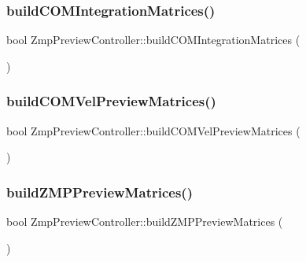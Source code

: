 \subsubsection{\texorpdfstring{build\+C\+O\+M\+Integration\+Matrices()}{buildCOMIntegrationMatrices()}}
{\footnotesize\ttfamily bool Zmp\+Preview\+Controller\+::build\+C\+O\+M\+Integration\+Matrices (\begin{DoxyParamCaption}{ }\end{DoxyParamCaption})}

\hypertarget{classZmpPreviewController_aa763d1c7a769f21eeaaaeb3f09a32aef}{}\label{classZmpPreviewController_aa763d1c7a769f21eeaaaeb3f09a32aef} 
\subsubsection{\texorpdfstring{build\+C\+O\+M\+Vel\+Preview\+Matrices()}{buildCOMVelPreviewMatrices()}}
{\footnotesize\ttfamily bool Zmp\+Preview\+Controller\+::build\+C\+O\+M\+Vel\+Preview\+Matrices (\begin{DoxyParamCaption}{ }\end{DoxyParamCaption})}

\hypertarget{classZmpPreviewController_aadf1b7cba1ac0a1e6ec3bc8e0b761d02}{}\label{classZmpPreviewController_aadf1b7cba1ac0a1e6ec3bc8e0b761d02} 
\subsubsection{\texorpdfstring{build\+Z\+M\+P\+Preview\+Matrices()}{buildZMPPreviewMatrices()}}
{\footnotesize\ttfamily bool Zmp\+Preview\+Controller\+::build\+Z\+M\+P\+Preview\+Matrices (\begin{DoxyParamCaption}{ }\end{DoxyParamCaption})}

\hypertarget{classZmpPreviewController_a321140d8b3d99cf82687c444344c161d}{}\label{classZmpPreviewController_a321140d8b3d99cf82687c444344c161d} 
